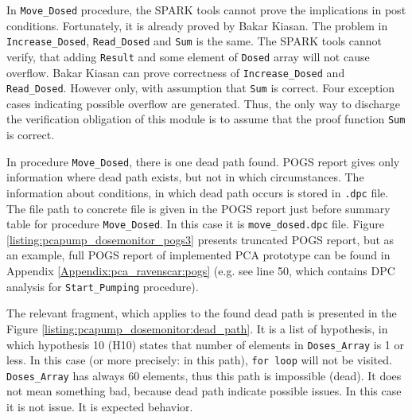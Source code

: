 In \lstinline{Move_Dosed} procedure, the SPARK tools cannot prove the implications in post conditions. Fortunately, it is already proved by Bakar Kiasan. The problem in \lstinline{Increase_Dosed}, \lstinline{Read_Dosed} and \lstinline{Sum} is the same. The SPARK tools cannot verify, that adding \lstinline{Result} and some element of \lstinline{Dosed} array will not cause overflow. Bakar Kiasan can prove correctness of \lstinline{Increase_Dosed} and \lstinline{Read_Dosed}. However only, with assumption that \lstinline{Sum} is correct. Four exception cases indicating possible overflow are generated. Thus, the only way to discharge the verification obligation of this module is to assume that the proof function \lstinline{Sum} is correct.

In procedure \lstinline{Move_Dosed}, there is one dead path found. POGS report gives only information where dead path exists, but not in which circumstances. The information about conditions, in which dead path occurs is stored in \lstinline{.dpc} file. The file path to concrete file is given in the POGS report just before summary table for procedure \lstinline{Move_Dosed}. In this case it is \lstinline{move_dosed.dpc} file. Figure \ref{listing:pcapump_dosemonitor_pogs3} presents truncated POGS report, but as an example, full POGS report of implemented PCA prototype can be found in Appendix \ref{Appendix:pca_ravenscar:pogs} (e.g. see line 50, which contains DPC analysis for \lstinline{Start_Pumping} procedure). 

The relevant fragment, which applies to the found dead path is presented in the Figure \ref{listing:pcapump_dosemonitor:dead_path}. It is a list of hypothesis, in which hypothesis 10 (H10) states that number of elements in \lstinline{Doses_Array} is 1 or less. In this case (or more precisely: in this path), \lstinline{for loop} will not be visited. \lstinline{Doses_Array} has always 60 elements, thus this path is impossible (dead). It does not mean something bad, because dead path indicate possible issues. In this case it is not issue. It is expected behavior.

